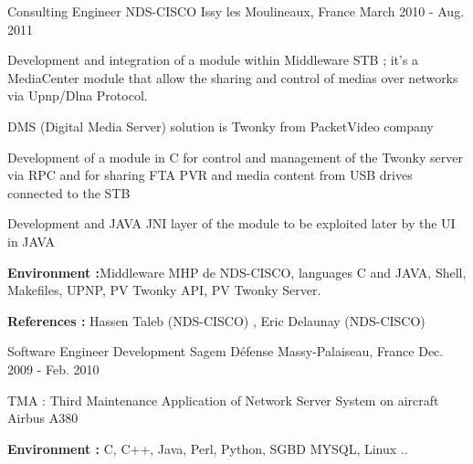 \documentclass[11pt, a4paper]{awesome-cv} %
\begin{document}
\begin{cventries}

    \cventry
    {Consulting Engineer} %
    {NDS-CISCO} %
    {Issy les Moulineaux, France} %
    {March 2010 - Aug. 2011} %
    { %
        \begin{cvitems}
            \item {Development and integration of a module within Middleware STB ; it’s a MediaCenter module that allow the sharing and control of medias over networks via Upnp/Dlna Protocol.}
            \item {DMS (Digital Media Server) solution is Twonky from PacketVideo company }
            \item {Development of a module in C for control and management of the Twonky server via RPC and for sharing FTA PVR and media content from USB drives connected to the STB}
            \item {Development and JAVA JNI  layer of the module to be exploited later by the UI in JAVA}
            \item { \textbf{Environment :}Middleware MHP de NDS-CISCO, languages C and JAVA, Shell, Makefiles, UPNP, PV Twonky API, PV Twonky Server. }
            \item { \textbf{References :} Hassen Taleb (NDS-CISCO) , Eric Delaunay (NDS-CISCO) }
        \end{cvitems}
    }


    \cventry
    {Software Engineer Development} %
    {Sagem Défense} %
    {Massy-Palaiseau, France} %
    {Dec. 2009 - Feb. 2010} %
    { %
        \begin{cvitems}
            \item {TMA : Third Maintenance Application of Network Server System on aircraft Airbus A380}
            \item { \textbf{Environment :} C, C++, Java, Perl, Python, SGBD MYSQL, Linux .. }
        \end{cvitems}
    }



\end{cventries}
\end{document}
